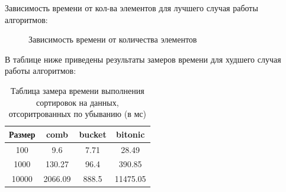 \documentclass[12pt]{report}
\begin{document}
	Зависимость времени от кол-ва элементов для лучшего случая работы алгоритмов:

	\begin{center}
		\begin{figure}[H]
		\center
		\caption{Зависимость времени от количества элементов}
		\end{figure}
	\end{center}
	
	В таблице ниже приведены результаты замеров времени для худшего случая работы алгоритмов:
	
	\begin{table} [H]
		\caption{Таблица замера времени выполнения сортировок на данных, отсоритрованных по убыванию (в мс)}
		\begin{center}
			\begin{tabular}{|c | c | c | c|}
				
				\hline
				
				Размер & comb & bucket & bitonic  \\ [0.5ex]
				
				\hline
				
				100 & 9.6 & 7.71 & 28.49 \\ 
				
				\hline 
				
				1000 & 130.27 & 96.4 & 390.85 \\ 
				
				\hline 
				
				10000 & 2066.09 & 888.5 & 11475.05 \\ 
				
				\hline 
				
			\end{tabular}
		\end{center}
	\end{table}
	
\end{document}
